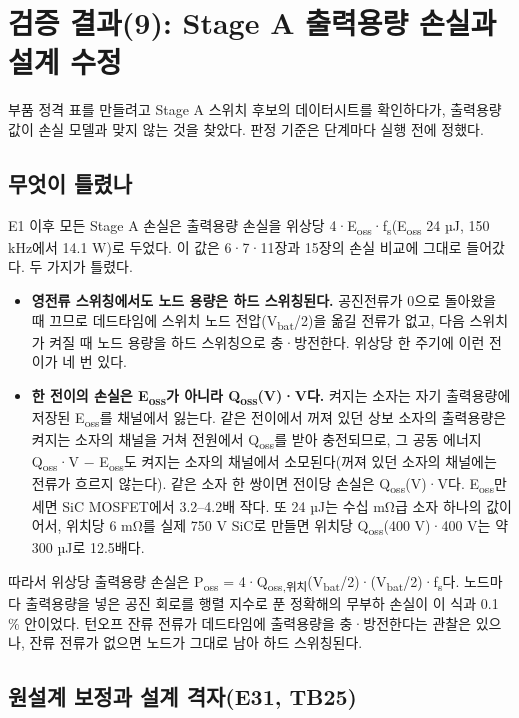 \chapter{검증 결과(9): Stage A 출력용량 손실과 설계 수정}

부품 정격 표를 만들려고 Stage A 스위치 후보의 데이터시트를 확인하다가, 출력용량 값이 손실 모델과 맞지 않는 것을 찾았다. 판정 기준은 단계마다 실행 전에 정했다.

\section{무엇이 틀렸나}

E1 이후 모든 Stage A 손실은 출력용량 손실을 위상당 4·E\textsubscript{oss}·f\textsubscript{s}(E\textsubscript{oss} 24 µJ, 150 kHz에서 14.1 W)로 두었다. 이 값은 6·7·11장과 15장의 손실 비교에 그대로 들어갔다. 두 가지가 틀렸다.

\begin{itemize}
\item \textbf{영전류 스위칭에서도 노드 용량은 하드 스위칭된다.} 공진전류가 0으로 돌아왔을 때 끄므로 데드타임에 스위치 노드 전압(V\textsubscript{bat}/2)을 옮길 전류가 없고, 다음 스위치가 켜질 때 노드 용량을 하드 스위칭으로 충·방전한다. 위상당 한 주기에 이런 전이가 네 번 있다.
\item \textbf{한 전이의 손실은 E\textsubscript{oss}가 아니라 Q\textsubscript{oss}(V)·V다.} 켜지는 소자는 자기 출력용량에 저장된 E\textsubscript{oss}를 채널에서 잃는다. 같은 전이에서 꺼져 있던 상보 소자의 출력용량은 켜지는 소자의 채널을 거쳐 전원에서 Q\textsubscript{oss}를 받아 충전되므로, 그 공동 에너지 Q\textsubscript{oss}·V − E\textsubscript{oss}도 켜지는 소자의 채널에서 소모된다(꺼져 있던 소자의 채널에는 전류가 흐르지 않는다)\cite{b32}. 같은 소자 한 쌍이면 전이당 손실은 Q\textsubscript{oss}(V)·V다. E\textsubscript{oss}만 세면 SiC MOSFET에서 3.2–4.2배 작다. 또 24 µJ는 수십 mΩ급 소자 하나의 값이어서, 위치당 6 mΩ를 실제 750 V SiC로 만들면 위치당 Q\textsubscript{oss}(400 V)·400 V는 약 300 µJ로 12.5배다.
\end{itemize}

따라서 위상당 출력용량 손실은 P\textsubscript{oss} = 4·Q\textsubscript{oss,위치}(V\textsubscript{bat}/2)·(V\textsubscript{bat}/2)·f\textsubscript{s}다. 노드마다 출력용량을 넣은 공진 회로를 행렬 지수로 푼 정확해의 무부하 손실이 이 식과 0.1 \% 안이었다. 턴오프 잔류 전류가 데드타임에 출력용량을 충·방전한다는 관찰은 있으나\cite{b33}, 잔류 전류가 없으면 노드가 그대로 남아 하드 스위칭된다.

\section{원설계 보정과 설계 격자(E31, TB25)}

